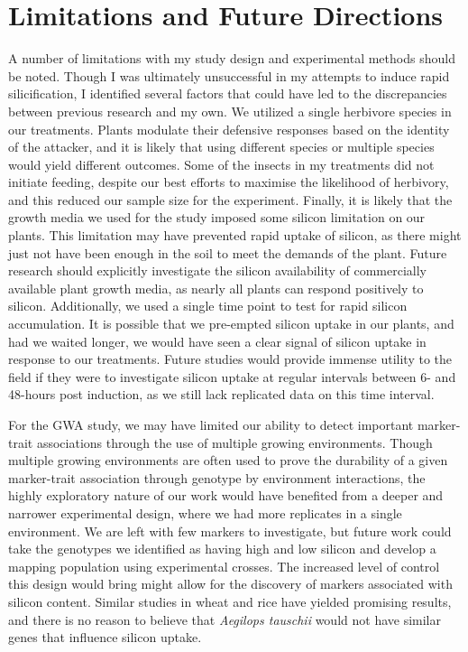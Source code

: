 \documentclass[12pt, letterpaper]{report}
\begin{document}
\section{Limitations and Future Directions}

A number of limitations with my study design and experimental methods should be noted. Though I was ultimately unsuccessful in my attempts to induce rapid silicification, I identified several factors that could have led to the discrepancies between previous research and my own. We utilized a single herbivore species in our treatments. Plants modulate their defensive responses based on the identity of the attacker, and it is likely that using different species or multiple species would yield different outcomes. Some of the insects in my treatments did not initiate feeding, despite our best efforts to maximise the likelihood of herbivory, and this reduced our sample size for the experiment. Finally, it is likely that the growth media we used for the study imposed some silicon limitation on our plants. This limitation may have prevented rapid uptake of silicon, as there might just not have been enough in the soil to meet the demands of the plant. Future research should explicitly investigate the silicon availability of commercially available plant growth media, as nearly all plants can respond positively to silicon. Additionally, we used a single time point to test for rapid silicon accumulation. It is possible that we pre-empted silicon uptake in our plants, and had we waited longer, we would have seen a clear signal of silicon uptake in response to our treatments. Future studies would provide immense utility to the field if they were to investigate silicon uptake at regular intervals between 6- and 48-hours post induction, as we still lack replicated data on this time interval. 

For the GWA study, we may have limited our ability to detect important marker-trait associations through the use of multiple growing environments. Though multiple growing environments are often used to prove the durability of a given marker-trait association through genotype by environment interactions, the highly exploratory nature of our work would have benefited from a deeper and narrower experimental design, where we had more replicates in a single environment. We are left with few markers to investigate, but future work could take the genotypes we identified as having high and low silicon and develop a mapping population using experimental crosses. The increased level of control this design would bring might allow for the discovery of markers associated with silicon content. Similar studies in wheat and rice have yielded promising results, and there is no reason to believe that \textit{Aegilops tauschii} would not have similar genes that influence silicon uptake.
\end{document}
